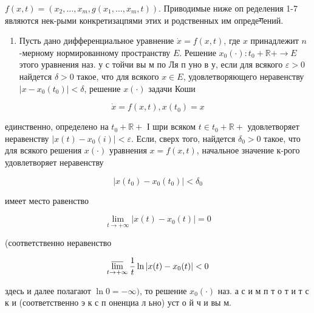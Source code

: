 \documentclass[10pt]{article}
\begin{document}
$f(x, t)=\left(x_{2}, \ldots, x_{m}, g\left(x_{1}, \ldots, x_{m}, t\right)\right)$. Приводимые ниже оп ределения 1-7 являются нек-рыми конкретизацпями этих и родственных им опредеगений.



\begin{enumerate}

  \item Пусть дано дифференциальное уравнение $\dot{x}=f(x, t)$, где $x$ принадлежит $n$-мерному нормированному пространству $E$. Решение $x_{0}(\cdot): t_{0}+\mathbb{R}+\longrightarrow E$ этого уравнения наз. у с тойчи вы м по Ля п уно в у, если для всякого $\varepsilon>0$ найдется $\delta>0$ такое, что для всякого $x \in E$, удовлетворяющего неравенству $\left|x-x_{0}\left(t_{0}\right)\right|<\delta$, решение $x(\cdot)$ задачи Коши

\end{enumerate}



\[

\dot{x}=f(x, t), x\left(t_{0}\right)=x

\]



единственно, определено на $t_{0}+\mathbb{R}+$ І шри всяком $t \in t_{0}+\mathbb{R}+$ удовлетворяет неравенству $\left|x(t)-x_{0}(i)\right|<\varepsilon$. Если, сверх того, найдется $\delta_{0}>0$ такое, что для всякого решения $x(\cdot)$ уравнения $x=f(x, t)$, начальное значение к-рого удовлетворяет неравенству



\[

\left|x\left(t_{0}\right)-x_{0}\left(t_{0}\right)\right|<\delta_{0}

\]



имеет место равенство



\[

\lim _{t \rightarrow+\infty}\left|x(t)-x_{0}(t)\right|=0

\]



(соответственно неравенство



\[

\varlimsup_{t \rightarrow+\infty} \frac{1}{t} \ln \left|x(t)-x_{0}(t)\right|<0

\]



здесь и далее полагают $\ln 0=-\infty)$, то решение $x_{0}(\cdot)$ наз. а с и м п т о т и т с к и (соответственно э к с п оненциа л ьно) уст о й ч и вы м.
\end{document}

